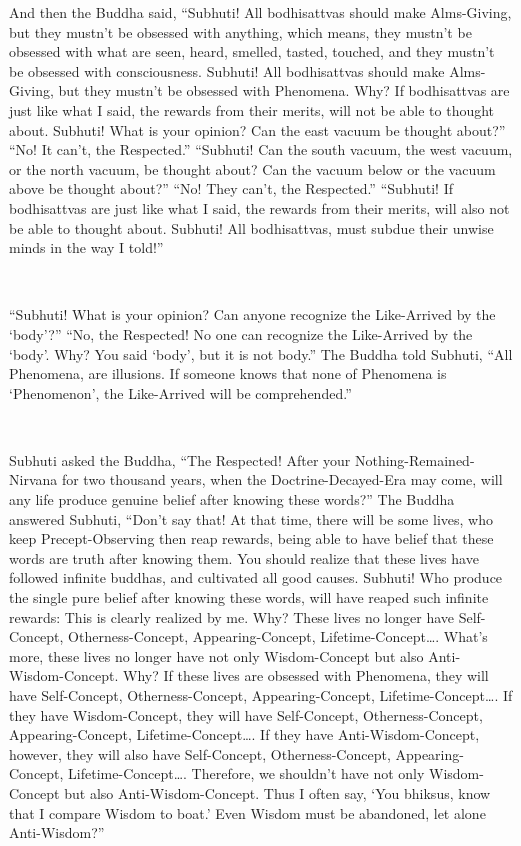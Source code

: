 \documentclass[a5paper,12pt]{book}
\begin{document}
     And then the Buddha said, ``Subhuti! All bodhisattvas should make Alms-Giving, but they mustn't be obsessed with anything, which means, they mustn't be obsessed with what are seen, heard, smelled, tasted, touched, and they mustn't be obsessed with consciousness. Subhuti! All bodhisattvas should make Alms-Giving, but they mustn't be obsessed with Phenomena. Why? If bodhisattvas are just like what I said, the rewards from their merits, will not be able to thought about. Subhuti! What is your opinion? Can the east vacuum be thought about?'' ``No! It can't, the Respected.'' ``Subhuti! Can the south vacuum, the west vacuum, or the north vacuum, be thought about? Can the vacuum below or the vacuum above be thought about?'' ``No! They can't, the Respected.'' ``Subhuti! If bodhisattvas are just like what I said, the rewards from their merits, will also not be able to thought about. Subhuti! All bodhisattvas, must subdue their unwise minds in the way I told!''

    ~

     ``Subhuti! What is your opinion? Can anyone recognize the Like-Arrived by the `body'?'' ``No, the Respected! No one can recognize the Like-Arrived by the `body'. Why? You said `body', but it is not body.'' The Buddha told Subhuti, ``All Phenomena, are illusions. If someone knows that none of Phenomena is `Phenomenon', the Like-Arrived will be comprehended.''

    ~

     Subhuti asked the Buddha, ``The Respected! After your Nothing-Remained-Nirvana for two thousand years, when the Doctrine-Decayed-Era may come, will any life produce genuine belief after knowing these words?'' The Buddha answered Subhuti, ``Don't say that! At that time, there will be some lives, who keep Precept-Observing then reap rewards, being able to have belief that these words are truth after knowing them. You should realize that these lives have followed infinite buddhas, and cultivated all good causes. Subhuti! Who produce the single pure belief after knowing these words, will have reaped such infinite rewards: This is clearly realized by me. Why? These lives no longer have Self-Concept, Otherness-Concept, Appearing-Concept, Lifetime-Concept\dots{}. What's more, these lives no longer have not only Wisdom-Concept but also Anti-Wisdom-Concept. Why? If these lives are obsessed with Phenomena, they will have Self-Concept, Otherness-Concept, Appearing-Concept, Lifetime-Concept\dots{}. If they have Wisdom-Concept, they will have Self-Concept, Otherness-Concept, Appearing-Concept, Lifetime-Concept\dots{}. If they have Anti-Wisdom-Concept, however, they will also have Self-Concept, Otherness-Concept, Appearing-Concept, Lifetime-Concept\dots{}. Therefore, we shouldn't have not only Wisdom-Concept but also Anti-Wisdom-Concept. Thus I often say, `You bhiksus, know that I compare Wisdom to boat.' Even Wisdom must be abandoned, let alone Anti-Wisdom?''
\end{document}
